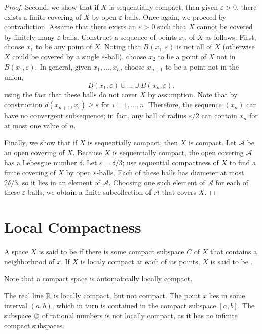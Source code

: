 \documentclass[12pt, a4paper, oneside, openright, titlepage]{book}
\begin{document}
\begin{proof}
    Second, we show that if $X$ is sequentially compact, then given $\varepsilon > 0$, there exists a finite covering of $X$ by open $\varepsilon$-balls. Once again, we proceed by contradiction. Assume that there exists an $\varepsilon > 0$ such that $X$ cannot be covered by finitely many $\varepsilon$-balls. Construct a sequence of points $x_n$ of $X$ as follows: First, choose $x_1$ to be any point of $X$. Noting that $B(x_1,\varepsilon)$ is not all of $X$ (otherwise $X$ could be covered by a single $\varepsilon$-ball), choose $x_2$ to be a point of $X$ not in $B(x_1,\varepsilon)$. In general, given $x_1,...,x_n$, choose $x_{n+1}$ to be a point not in the union, \begin{equation*}
        B(x_1,\varepsilon)\cup...\cup B(x_n,\varepsilon),
    \end{equation*}
    using the fact that these balls do not cover $X$ by assumption. Note that by construction $d(x_{n+1},x_i) \geq \varepsilon$ for $i = 1,...,n$. Therefore, the sequence $(x_n)$ can have no convergent subsequence; in fact, any ball of radius $\varepsilon/2$ can contain $x_n$ for at most one value of $n$.

    Finally, we show that if $X$ is sequentially compact, then $X$ is compact. Let $\mathcal{A}$ be an open covering of $X$. Because $X$ is sequentially compact, the open covering $\mathcal{A}$ has a Lebesgue number $\delta$. Let $\varepsilon = \delta/3$; use sequential compactness of $X$ to find a finite covering of $X$ by open $\varepsilon$-balls. Each of these balls has diameter at most $2\delta/3$, so it lies in an element of $\mathcal{A}$. Choosing one such element of $\mathcal{A}$ for each of these $\varepsilon$-balls, we obtain a finite subcollection of $\mathcal{A}$ that covers $X$.
\end{proof}


\section{Local Compactness}

\begin{defn}
    A space $X$ is said to be  if there is some compact subspace $C$ of $X$ that contains a neighborhood of $x$. If $X$ is localy compact at each of its points, $X$ is said to be .
\end{defn}

Note that a compact space is automatically locally compact.

\begin{eg}
    The real line $\mathbb R$ is locally compact, but not compact. The point $x$ lies in some interval $(a,b)$, which in turn is contained in the compact subspace $[a,b]$. The subspace $\mathbb Q$ of rational numbers is not locally compact, as it has no infinite compact subspaces.
\end{eg}
\end{document}
